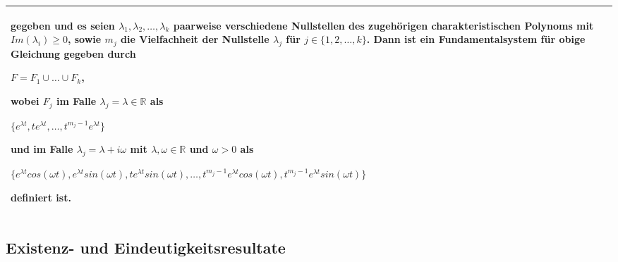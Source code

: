 \begin{table}[H]
\begin{tabularx}{\textwidth}{X m{16cm}}
                gegeben und es seien $\lambda_1,\lambda_2,\dots,\lambda_k$ paarweise verschiedene Nullstellen des zugehörigen charakteristischen
                Polynoms mit $Im(\lambda_i) \geq 0$, sowie $m_j$ die Vielfachheit der Nullstelle $\lambda_j$ für $j \in \{1,2,\dots,k\}$. \hfill \break
                Dann ist ein Fundamentalsystem für obige Gleichung gegeben durch \hfill \break
                \centerline{$ F = F_1 \cup \dots \cup F_k $,}
                wobei $F_j$ im Falle $\lambda_j = \lambda \in \mathbb{R}$ als \hfill \break
                \centerline{$ \{e^{\lambda t},te^{\lambda t},\dots,t^{m_j-1}e^{\lambda t} \} $}
                und im Falle $\lambda_j = \lambda + i\omega$ mit $\lambda, \omega\in \mathbb{R}$ und $\omega > 0$ als \hfill \break
                \centerline{$ \{ e^{\lambda t}cos(\omega t), e^{\lambda t}sin(\omega t), te^{\lambda t}sin(\omega t), \dots,
                t^{m_j-1}e^{\lambda t}cos(\omega t),  t^{m_j-1}e^{\lambda t}sin(\omega t)\} $}
                definiert ist. \\


        \bottomrule
    \end{tabularx}
    \end{table}


\subsection{Existenz- und Eindeutigkeitsresultate}

